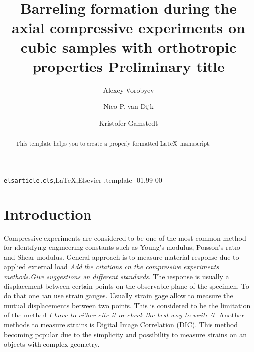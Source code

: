 \documentclass[review]{elsarticle}
\begin{document}
\begin{frontmatter}

\title{Barreling formation during the axial compressive experiments on cubic
samples with orthotropic properties {\color{red} Preliminary title}}








\author{Alexey Vorobyev}


\author{Nico P. van Dijk}
\author{Kristofer Gamstedt}

\address{Uppsala University, Division of Appplied Mechanics,
Uppsala, Sweden }



\begin{abstract}
This template helps you to create a properly formatted \LaTeX\ manuscript.
\end{abstract}

\begin{keyword}
\texttt{elsarticle.cls}\sep \LaTeX\sep Elsevier \sep template
-01\sep  99-00
\end{keyword}

\end{frontmatter}

\linenumbers

\section{Introduction}
Compressive experiments are considered to be one of the most common method for identifying engineering constants such as Young's
modulus, Poisson's ratio and Shear modulus. General approach is to measure material response 
due to applied external load \textit{\color {red} Add the citations on
the compressive experiments methods.Give suggestions on different standards}.
The response is usually a displacement between certain points on the
observable plane of the specimen. To do that one can use strain gauges. Usually
strain gage allow to measure the mutual displacements between two points. This
is considered to be the limitation of the method\textit{\color {red} I have
to either cite it or check the best way to write it}. Another methods to measure
strains is Digital Image Correlation (DIC). This method becoming popular due to
the simplicity and possibility to measure strains on an objects with complex
geometry.
\end{document}
